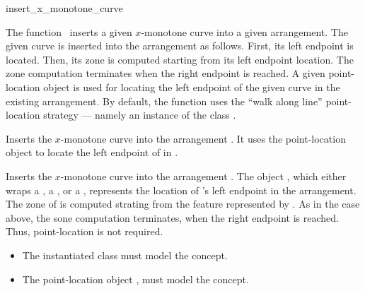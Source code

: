 \ccRefPageBegin

\begin{ccRefFunction}{insert_x_monotone_curve}

\ccDefinition

The function \ccRefName\ inserts a given $x$-monotone curve into a
given arrangement. The given curve is inserted into the arrangement as
follows. First, its left endpoint is located. Then, its zone is computed
starting from its left endpoint location. The zone computation terminates
when the right endpoint is reached. A given point-location object is used
for locating the left endpoint of the given curve in the existing
arrangement. By default, the function uses the ``walk along line''
point-location strategy --- namely an instance of the class
.


Inserts the $x$-monotone curve  into the arrangement . It
uses the point-location object  to locate the left endpoint of
 in .


Inserts the $x$-monotone curve  into the arrangement . 
The object , which either wraps a , a
, or a , represents the
location of 's left endpoint in the arrangement. The zone of
 is computed strating from the feature represented by .
As in the case above, the sone computation terminates, when the right
endpoint is reached.  Thus, point-location is not required.

\ccRequirements
\begin{itemize}
\item The instantiated  class must model the
   concept.
\item The point-location object , must model the
   concept.
\end{itemize}
			 
\end{ccRefFunction}

\ccRefPageEnd
